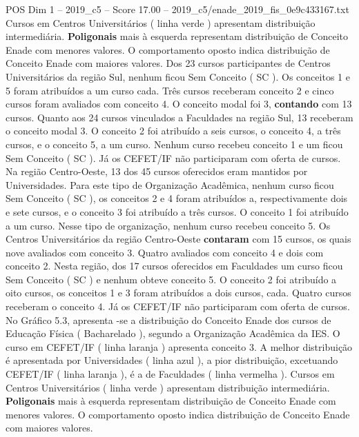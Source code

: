 \begin{textsample}{POS Dim 1 – 2019\_c5 – Score 17.00 – 2019\_c5/enade\_2019\_fis\_0e9c433167.txt}
Cursos em Centros Universitários ( linha verde ) apresentam distribuição intermediária. \textbf{Poligonais} mais à esquerda representam distribuição de Conceito Enade com menores valores.
O comportamento oposto indica distribuição de Conceito Enade com maiores valores.
Dos 23 cursos participantes de Centros Universitários da região Sul, nenhum ficou Sem Conceito ( SC ).
Os conceitos 1 e 5 foram atribuídos a um curso cada.
Três cursos receberam conceito 2 e cinco cursos foram avaliados com conceito 4.
O conceito modal foi 3, \textbf{contando} com 13 cursos.
Quanto aos 24 cursos vinculados a Faculdades na região Sul, 13 receberam o conceito modal 3.
O conceito 2 foi atribuído a seis cursos, o conceito 4, a três cursos, e o conceito 5, a um curso.
Nenhum curso recebeu conceito 1 e um ficou Sem Conceito ( SC ).
Já os CEFET/IF não participaram com oferta de cursos.
Na região Centro-Oeste, 13 dos 45 cursos oferecidos eram mantidos por Universidades.
Para este tipo de Organização Acadêmica, nenhum curso ficou Sem Conceito ( SC ), os conceitos 2 e 4 foram atribuídos a, respectivamente dois e sete cursos, e o conceito 3 foi atribuído a três cursos.
O conceito 1 foi atribuído a um curso.
Nesse tipo de organização, nenhum curso recebeu conceito 5.
Os Centros Universitários da região Centro-Oeste \textbf{contaram} com 15 cursos, os quais nove avaliados com conceito 3.
Quatro avaliados com conceito 4 e dois com conceito 2.
Nesta região, dos 17 cursos oferecidos em Faculdades um curso ficou Sem Conceito ( SC ) e nenhum obteve conceito 5.
O conceito 2 foi atribuído a oito cursos, os conceitos 1 e 3 foram atribuídos a dois cursos, cada.
Quatro cursos receberam o conceito 4.
Já os CEFET/IF não participaram com oferta de cursos.
No Gráfico 5.3, apresenta -se a distribuição do Conceito Enade dos cursos de Educação Física ( Bacharelado ), segundo a Organização Acadêmica da IES.
O curso em CEFET/IF ( linha laranja ) apresenta conceito 3.
A melhor distribuição é apresentada por Universidades ( linha azul ), a pior distribuição, excetuando CEFET/IF ( linha laranja ), é a de Faculdades ( linha vermelha ).
Cursos em Centros Universitários ( linha verde ) apresentam distribuição intermediária. \textbf{Poligonais} mais à esquerda representam distribuição de Conceito Enade com menores valores.
O comportamento oposto indica distribuição de Conceito Enade com maiores valores.

\end{textsample}
